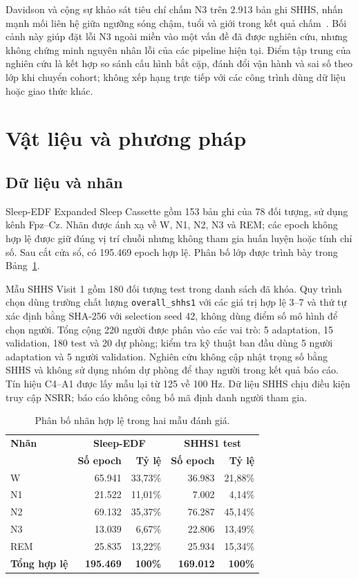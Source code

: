 \documentclass[10pt,a4paper]{article}
\begin{document}
Davidson và cộng sự khảo sát tiêu chí chấm N3 trên 2.913 bản ghi SHHS, nhấn mạnh mối liên hệ giữa ngưỡng sóng chậm, tuổi và giới trong kết quả chấm~\cite{davidson2025n3}. Bối cảnh này giúp đặt lỗi N3 ngoài miền vào một vấn đề đã được nghiên cứu, nhưng không chứng minh nguyên nhân lỗi của các pipeline hiện tại. Điểm tập trung của nghiên cứu là kết hợp so sánh cấu hình bắt cặp, đánh đổi vận hành và sai số theo lớp khi chuyển cohort; không xếp hạng trực tiếp với các công trình dùng dữ liệu hoặc giao thức khác.

\section{Vật liệu và phương pháp}

\subsection{Dữ liệu và nhãn}

Sleep-EDF Expanded Sleep Cassette gồm 153 bản ghi của 78 đối tượng, sử dụng kênh Fpz--Cz. Nhãn được ánh xạ về W, N1, N2, N3 và REM; các epoch không hợp lệ được giữ đúng vị trí chuỗi nhưng không tham gia huấn luyện hoặc tính chỉ số. Sau cắt cửa sổ, có 195.469 epoch hợp lệ. Phân bố lớp được trình bày trong Bảng~\ref{tab:class-distribution}.

Mẫu SHHS Visit 1 gồm 180 đối tượng test trong danh sách đã khóa. Quy trình chọn dùng trường chất lượng \texttt{overall\_shhs1} với các giá trị hợp lệ 3--7 và thứ tự xác định bằng SHA-256 với selection seed 42, không dùng điểm số mô hình để chọn người. Tổng cộng 220 người được phân vào các vai trò: 5 adaptation, 15 validation, 180 test và 20 dự phòng; kiểm tra kỹ thuật ban đầu dùng 5 người adaptation và 5 người validation. Nghiên cứu không cập nhật trọng số bằng SHHS và không sử dụng nhóm dự phòng để thay người trong kết quả báo cáo. Tín hiệu C4--A1 được lấy mẫu lại từ 125 về 100 Hz. Dữ liệu SHHS chịu điều kiện truy cập NSRR; báo cáo không công bố mã định danh người tham gia.

\begin{table}[t]
\centering
\caption{Phân bố nhãn hợp lệ trong hai mẫu đánh giá.}
\label{tab:class-distribution}
\small
\begin{tabular}{lrr|rr}
\toprule
\textbf{Nhãn} & \multicolumn{2}{c|}{\textbf{Sleep-EDF}} & \multicolumn{2}{c}{\textbf{SHHS1 test}} \\
 & \textbf{Số epoch} & \textbf{Tỷ lệ} & \textbf{Số epoch} & \textbf{Tỷ lệ} \\
\midrule
W & 65.941 & 33,73\% & 36.983 & 21,88\% \\
N1 & 21.522 & 11,01\% & 7.002 & 4,14\% \\
N2 & 69.132 & 35,37\% & 76.287 & 45,14\% \\
N3 & 13.039 & 6,67\% & 22.806 & 13,49\% \\
REM & 25.835 & 13,22\% & 25.934 & 15,34\% \\
\midrule
\textbf{Tổng hợp lệ} & \textbf{195.469} & \textbf{100\%} & \textbf{169.012} & \textbf{100\%} \\
\bottomrule
\end{tabular}
\end{table}
\end{document}
